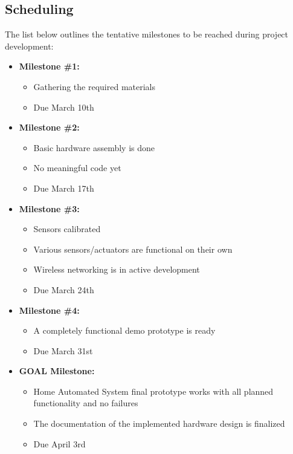 \documentclass[journal]{IEEEtran}
\begin{document}
\subsection{Scheduling}
The list below outlines the tentative milestones to be reached during project development:
\begin{itemize}
	\item{\textbf{Milestone \#1:}}
		\begin{itemize}
		\item{Gathering the required materials}
		\item{Due March 10th}
		\end{itemize} 
	\item{\textbf{Milestone \#2:}}
		\begin{itemize}
		\item{Basic hardware assembly is done}
		\item{No meaningful code yet}
		\item{Due March 17th}
		\end{itemize} 
	\item{\textbf{Milestone \#3:}}
		\begin{itemize}
		\item{Sensors calibrated}
		\item{Various sensors/actuators are functional on their own}
		\item{Wireless networking is in active development}
		\item{Due March 24th}
		\end{itemize} 
	\item{\textbf{Milestone \#4:}}
		\begin{itemize}
		\item{ A completely functional demo prototype is ready}
		\item{Due March 31st}
		\end{itemize} 
	\item{\textbf{GOAL Milestone:}  }
		\begin{itemize}
		\item{Home Automated System final prototype works with all planned functionality and no failures}
		\item{The documentation of the implemented hardware design is finalized}
		\item{Due April 3rd}
		\end{itemize} 
\end{itemize} 
\end{document}
